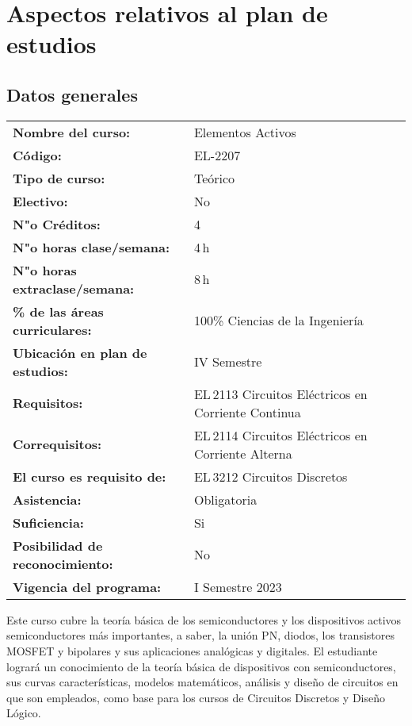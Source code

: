 \documentclass[11pt,oneside,letterpaper]{article}
\renewcommand{\CodigoCurso}{EL-2207}
\renewcommand{\NombreCurso}{Elementos Activos}
\begin{document}
\graphicspath{{./}{./fig/}{./img/}}

\paginaTitulo

\section{Aspectos relativos al plan de estudios}

\subsection{Datos generales}

\hspace*{-\margoffset}
\begin{tabular}{ll}
  \textbf{Nombre del curso:} & \NombreCurso \\[1ex]
  \textbf{Código:} & \CodigoCurso \\[1ex]
  \textbf{Tipo de curso:} & Teórico \\[1ex]
  \textbf{Electivo:} & No \\[1ex]
  \textbf{N"o Créditos:} & 4 \\[1ex]
  \textbf{N"o horas clase/semana:} & 4\,h  \\[1ex]
  \textbf{N"o horas extraclase/semana:} & 8\,h \\[1ex]
  \textbf{\% de las áreas curriculares:} & 100\% Ciencias de la Ingeniería \\[1ex]
  \textbf{Ubicación en plan de estudios:} & IV Semestre\\[1ex]
  \textbf{Requisitos:} & EL\,2113 Circuitos Eléctricos en Corriente Continua \\[1ex]
  \textbf{Correquisitos:} & 
  EL\,2114 Circuitos Eléctricos en Corriente Alterna \\[1ex]
  \textbf{El curso es requisito de:} & EL\,3212 Circuitos Discretos\\[1ex]
  \textbf{Asistencia:} & Obligatoria \\[1ex]
  \textbf{Suficiencia:} & Si \\[1ex]
  \textbf{Posibilidad de reconocimiento:} & No \\[1ex]
  \textbf{Vigencia del programa:} & I Semestre 2023 \\[1ex]
\end{tabular} 

%
Este curso cubre la teoría básica de los semiconductores y los dispositivos activos semiconductores más importantes, a saber, la unión PN, diodos, los transistores MOSFET y bipolares y sus aplicaciones analógicas y digitales. El estudiante logrará un conocimiento de la teoría básica de dispositivos con semiconductores, sus curvas características, modelos matemáticos, análisis y diseño de circuitos en que son empleados, como base para los cursos de Circuitos Discretos y Diseño Lógico. 
\end{document}
